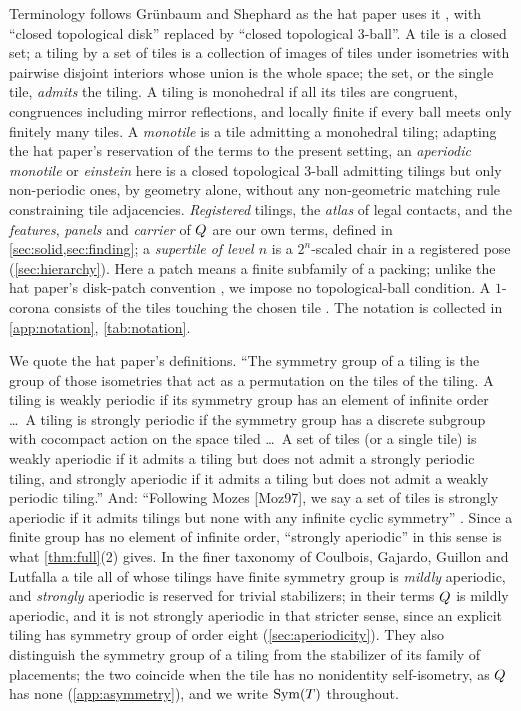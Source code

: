 Terminology follows Grünbaum and Shephard as the hat paper uses it \cite{GS16,SMKGS24}, with
``closed topological disk'' replaced by ``closed topological $3$-ball''. A tile is a closed set;
a tiling by a set of tiles is a collection of images of tiles under isometries with pairwise
disjoint interiors whose union is the whole space; the set, or the single tile, \emph{admits} the
tiling. A tiling is monohedral if all its tiles are congruent, congruences including mirror
reflections, and locally finite if every ball meets only finitely many tiles. A \emph{monotile}
is a tile admitting a monohedral tiling; adapting the hat paper's reservation of the terms to the
present setting, an \emph{aperiodic monotile} or \emph{einstein} here is a closed topological
$3$-ball admitting tilings but only non-periodic ones, by geometry alone, without any
non-geometric matching rule constraining tile adjacencies. \emph{Registered} tilings, the \emph{atlas} of legal contacts,
and the \emph{features}, \emph{panels} and \emph{carrier} of $Q$ are our own terms, defined
in \cref{sec:solid,sec:finding}; a \emph{supertile of level $n$} is a $2^n$-scaled chair in a
registered pose (\cref{sec:hierarchy}). Here a patch means a finite subfamily of a packing;
unlike the hat paper's disk-patch convention \cite{SMKGS24}, we impose no topological-ball
condition. A $1$-corona consists of the tiles touching the chosen tile \cite{Fle10}. The notation
is collected in \cref{app:notation}, \cref{tab:notation}.

We quote the hat paper's definitions. ``The symmetry group of a tiling is the group of those
isometries that act as a permutation on the tiles of the tiling. A tiling is weakly periodic if
its symmetry group has an element of infinite order \dots\ A tiling is strongly periodic if the
symmetry group has a discrete subgroup with cocompact action on the space tiled \dots\ A set of
tiles (or a single tile) is weakly aperiodic if it admits a tiling but does not admit a strongly
periodic tiling, and strongly aperiodic if it admits a tiling but does not admit a weakly periodic
tiling.'' And: ``Following Mozes [Moz97], we say a set of tiles is strongly aperiodic if it admits
tilings but none with any infinite cyclic symmetry'' \cite{SMKGS24,Moz97}. Since a finite group
has no element of infinite order, ``strongly aperiodic'' in this sense is what
\cref{thm:full}(2) gives. In the finer taxonomy of Coulbois, Gajardo, Guillon
and Lutfalla \cite[\S2.1]{CGGL24} a tile all of whose tilings have finite symmetry group is
\emph{mildly} aperiodic, and \emph{strongly} aperiodic is reserved for trivial stabilizers; in
their terms $Q$ is mildly aperiodic, and it is not strongly aperiodic in that stricter
sense, since an explicit tiling has symmetry group of order eight (\cref{sec:aperiodicity}).
They also distinguish the symmetry group of a tiling from the
stabilizer of its family of placements; the two coincide when the tile has no nonidentity self-isometry, as
$Q$ has none (\cref{app:asymmetry}), and we write $\operatorname{Sym}(T)$ throughout.

